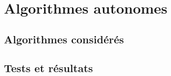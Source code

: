 \documentclass[a4paper,10pt]{report}
\begin{document}
\chapter{Algorithmes autonomes}
\section{Algorithmes considérés}
\subsection{}

\section{Tests et résultats}
\end{document}

